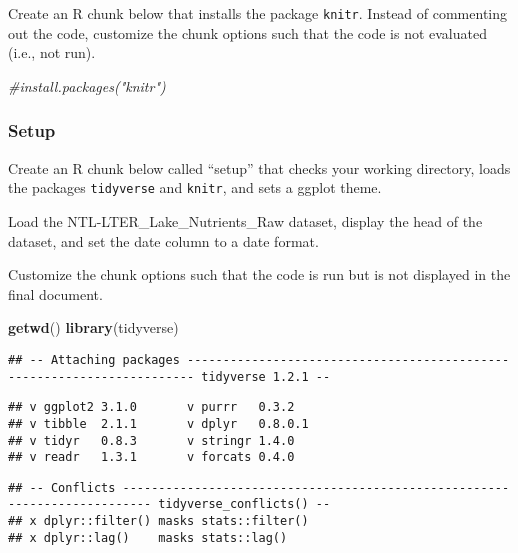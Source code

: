 \documentclass[]{article}
\newenvironment{Shaded}{\begin{snugshade}}{\end{snugshade}}
\newcommand{\KeywordTok}[1]{\textcolor[rgb]{0.13,0.29,0.53}{\textbf{#1}}}
\newcommand{\DataTypeTok}[1]{\textcolor[rgb]{0.13,0.29,0.53}{#1}}
\newcommand{\StringTok}[1]{\textcolor[rgb]{0.31,0.60,0.02}{#1}}
\newcommand{\CommentTok}[1]{\textcolor[rgb]{0.56,0.35,0.01}{\textit{#1}}}
\newcommand{\OperatorTok}[1]{\textcolor[rgb]{0.81,0.36,0.00}{\textbf{#1}}}
\newcommand{\NormalTok}[1]{#1}
\begin{document}
Create an R chunk below that installs the package \texttt{knitr}.
Instead of commenting out the code, customize the chunk options such
that the code is not evaluated (i.e., not run).

\begin{Shaded}
\begin{Highlighting}[]
\CommentTok{#install.packages("knitr")}
\end{Highlighting}
\end{Shaded}

\subsubsection{Setup}\label{setup}

Create an R chunk below called ``setup'' that checks your working
directory, loads the packages \texttt{tidyverse} and \texttt{knitr}, and
sets a ggplot theme.

Load the NTL-LTER\_Lake\_Nutrients\_Raw dataset, display the head of the
dataset, and set the date column to a date format.

Customize the chunk options such that the code is run but is not
displayed in the final document.

\begin{Shaded}
\begin{Highlighting}[]
\KeywordTok{getwd}\NormalTok{()}
\KeywordTok{library}\NormalTok{(tidyverse)}
\end{Highlighting}
\end{Shaded}

\begin{verbatim}
## -- Attaching packages ----------------------------------------------------------------------- tidyverse 1.2.1 --
\end{verbatim}

\begin{verbatim}
## v ggplot2 3.1.0       v purrr   0.3.2  
## v tibble  2.1.1       v dplyr   0.8.0.1
## v tidyr   0.8.3       v stringr 1.4.0  
## v readr   1.3.1       v forcats 0.4.0
\end{verbatim}

\begin{verbatim}
## -- Conflicts -------------------------------------------------------------------------- tidyverse_conflicts() --
## x dplyr::filter() masks stats::filter()
## x dplyr::lag()    masks stats::lag()
\end{verbatim}

\begin{Shaded}
\end{Shaded}
\end{document}
